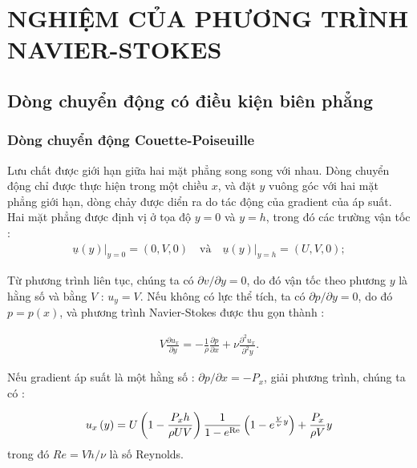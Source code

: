 \documentclass[CO_LUU_CHAT.tex]{subfiles}
\begin{document}
\chapter{NGHIỆM CỦA PHƯƠNG TRÌNH NAVIER-STOKES}

\newpage

\section{Dòng chuyển động có điều kiện biên phẳng}
\subsection{Dòng chuyển động Couette-Poiseuille}

Lưu chất được giới hạn giữa hai mặt phẳng song song với nhau. Dòng chuyển động chỉ được thực hiện trong một chiều $x$, và đặt $y$ vuông góc với hai mặt phẳng 
giới hạn, dòng chảy được diển ra do tác động của gradient của áp suất. Hai mặt phẳng được định vị ở tọa độ $y=0$ và $y=h$, trong đó các trường vận tốc :
\begin{equation}
	\begin{aligned}
        \left.\underline{u}\left(y\right)\right|_{y = 0}=(0,V,0)\quad\text{và}\quad\left.\underline{u}\left(y\right)\right|_{y = h}=(U,V,0);
	\end{aligned}
\end{equation}

Từ phương trình liên tục, chúng ta có $\partial v/\partial y = 0$, do đó vận tốc theo phương $y$ là hằng số và bằng $V$ : $u_y=V$. Nếu không có lực thể tích, ta có $\partial p/\partial y = 0$, do đó $p=p(x)$, và phương trình Navier-Stokes được thu gọn thành :

\begin{equation}
	\begin{aligned}
        V\frac{\partial u_x}{\partial y}=-\frac{1}{\rho}\frac{\partial p}{\partial x}+\nu\frac{\partial^2u_x}{\partial^2y}.
	\end{aligned}
\end{equation}

Nếu gradient áp suất là một hằng số : $\partial p/\partial x=-P_x$, giải phương trình, chúng ta có :

\begin{equation}
	\begin{aligned}
        {u_x}\left( y \right) = U\left( {1 - \frac{{{P_x}h}}{{\rho UV}}} \right)\frac{1}{{1 - {e^{{\mathop{\rm Re}\nolimits} }}}}\left( {1 - {e^{\frac{V}{\nu }y}}} \right) + \frac{{{P_x}}}{{\rho V}}y
	\end{aligned}
\end{equation}
trong đó $Re=Vh/\nu$ là số Reynolds.
\end{document}
